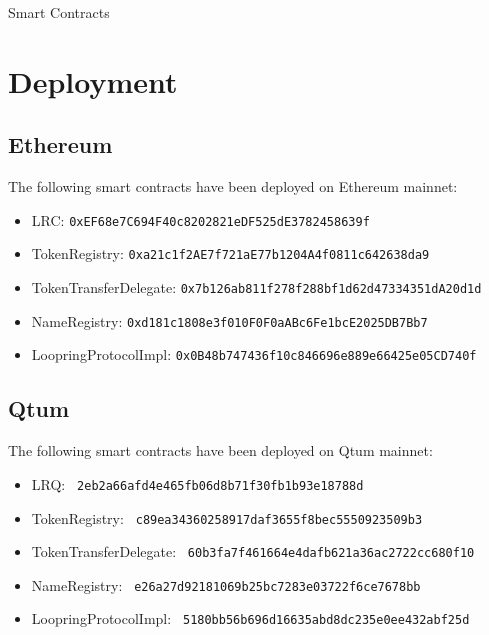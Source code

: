 \documentclass[UTF8,nofonts]{article}
\makeatletter
\newenvironment{figurehere}
 {\def\@captype{figure}}
 {}
\makeatother
\begin{document}
\begin{appendices}
\begin{center}
\begin{figurehere}
\caption{Smart Contracts}
\label{fig:smartcontracts}
\end{figurehere}
\end{center}

\section{Deployment}


\subsection{Ethereum}
The following smart contracts have been deployed on Ethereum mainnet:
\begin{itemize}
\item LRC: \verb|0xEF68e7C694F40c8202821eDF525dE3782458639f|
\item TokenRegistry: \verb|0xa21c1f2AE7f721aE77b1204A4f0811c642638da9|
\item TokenTransferDelegate: \verb|0x7b126ab811f278f288bf1d62d47334351dA20d1d|
\item NameRegistry: \verb|0xd181c1808e3f010F0F0aABc6Fe1bcE2025DB7Bb7|
\item LoopringProtocolImpl: \verb|0x0B48b747436f10c846696e889e66425e05CD740f|
\end{itemize}

\subsection{Qtum}
The following smart contracts have been deployed on Qtum mainnet:
\begin{itemize}
\item LRQ: \verb| 2eb2a66afd4e465fb06d8b71f30fb1b93e18788d |
\item TokenRegistry: \verb| c89ea34360258917daf3655f8bec5550923509b3 |
\item TokenTransferDelegate: \verb| 60b3fa7f461664e4dafb621a36ac2722cc680f10 |
\item NameRegistry: \verb| e26a27d92181069b25bc7283e03722f6ce7678bb |
\item LoopringProtocolImpl: \verb| 5180bb56b696d16635abd8dc235e0ee432abf25d |
\end{itemize}

\end{appendices}
\end{document}
